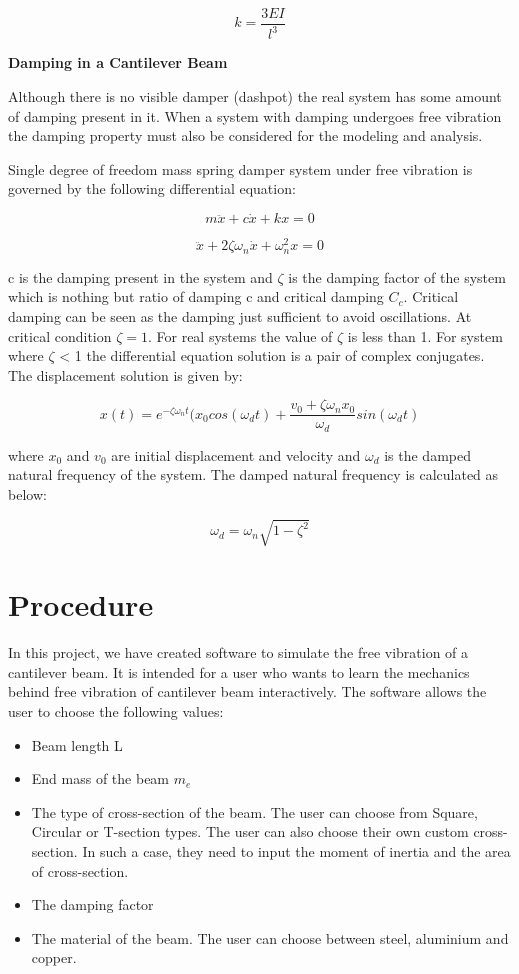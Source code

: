 \documentclass{report}
\begin{document}
$$ k = \frac{3EI}{l^3} $$

\bigskip
{\bfseries Damping in a Cantilever Beam}
\bigskip

Although there is no visible damper (dashpot) the real system has some amount of damping present in it. When a system with damping undergoes free vibration the damping property must also be considered for the modeling and analysis.

Single degree of freedom mass spring damper system under free vibration is governed by the following differential equation:

$$ m \ddot{x} + c\dot{x} + kx = 0$$

$$ \ddot{x} + 2\zeta \omega_n\dot{x} + \omega_n^2x = 0$$

c is the damping present in the system and $\zeta$ is the damping factor of the system which is nothing but ratio of damping c and critical damping $C_c$. Critical damping can be seen as the damping just sufficient to avoid oscillations. At critical condition $\zeta=1$. For real systems the value of $\zeta$ is less than 1. For system where $\zeta$ < 1 the differential equation solution is a pair of complex conjugates. The displacement solution is given by:

$$ x(t) = e^{-\zeta \omega_n t}(x_0 cos(\omega_d t) + \frac{v_0 + \zeta \omega_nx_0}{\omega_d}sin(\omega_d t)$$
 
where $x_0$ and $v_0$ are initial displacement and velocity and $\omega_d$ is the damped natural frequency of the system. The damped natural frequency is calculated as below:

$$ \omega_d = \omega_n \sqrt{1-\zeta^2} $$

\section{Procedure}

In this project, we have created software to simulate the free vibration of a cantilever beam. It is intended for a user who wants to learn the mechanics behind free vibration of cantilever beam interactively. The software allows the user to choose the following values:

\begin{itemize}
    \item Beam length L
    \item End mass of the beam $m_e$
    \item The type of cross-section of the beam. The user can choose from Square, Circular or T-section types. The user can also choose their own custom cross-section. In such a case, they need to input the moment of inertia and the area of cross-section.
    \item The damping factor 
    \item The material of the beam. The user can choose between steel, aluminium and copper.
\end{itemize}
\end{document}
